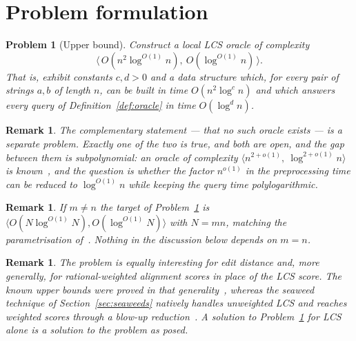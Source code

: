 \documentclass[10pt]{article}
\newtheorem{problem}{Problem}
\newtheorem{remark}[theorem]{Remark}
\newcommand{\poly}{\log^{O(1)}}
\begin{document}
\section{Problem formulation}

\begin{problem}[Upper bound]\label{prob:upper}
Construct a local LCS oracle of complexity
\[
\bigl\langle\, O(n^2\poly n),\ O(\poly n)\,\bigr\rangle .
\]
That is, exhibit constants $c,d>0$ and a data structure which, for every pair
of strings $a,b$ of length $n$, can be built in time $O(n^2\log^c n)$ and which
answers every query of Definition~\ref{def:oracle} in time $O(\log^d n)$.
\end{problem}

\begin{remark}\label{rem:dichotomy}
The complementary statement --- that no such oracle exists --- is a separate
problem. Exactly one of the two is true, and both are open, and the gap
between them is subpolynomial: an oracle of complexity
$\langle n^{2+o(1)},\ \log^{2+o(1)}n\rangle$ is known~\cite{CGMW21}, and the question is whether the factor $n^{o(1)}$ in
the preprocessing time can be reduced to $\poly n$ while keeping the query time
polylogarithmic.
\end{remark}

\begin{remark}\label{rem:unbalanced}
If $m\ne n$ the target of Problem~\ref{prob:upper} is
$\langle O(N\poly N),O(\poly N)\rangle$ with $N=mn$, matching the
parametrisation of~\cite{CGMW21}. Nothing in the discussion below depends on
$m=n$.
\end{remark}

\begin{remark}\label{rem:editdistance}
The problem is equally interesting for edit distance and, more generally, for
rational-weighted alignment scores in place of the LCS score. The known upper
bounds were proved in that generality~\cite{CGMW21}, whereas the seaweed
technique of Section~\ref{sec:seaweeds} natively handles
unweighted LCS and reaches weighted scores through a blow-up
reduction~\cite[Chapter 6]{TiskinArXiv}. A solution to
Problem~\ref{prob:upper} for LCS alone is a solution to the problem as posed.
\end{remark}
\end{document}
